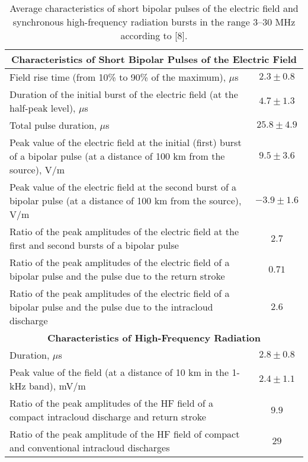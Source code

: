 \documentclass[a4paper, 12pt, onecolumn,singlespacing]{article}
\begin{document}
	\begin{table}[htbp]
		\centering
		\caption{Average characteristics of short bipolar pulses of the electric field and synchronous high-frequency radiation bursts in the range 3--30 MHz according to [8].}
		\begin{tabularx}{\textwidth}{@{}p{10cm}c@{}}
			\toprule
			\multicolumn{2}{c}{\textbf{Characteristics of Short Bipolar Pulses of the Electric Field}} \\
			\midrule
			Field rise time (from 10\% to 90\% of the maximum), $\mu$s & $2.3 \pm 0.8$ \\
			Duration of the initial burst of the electric field (at the half-peak level), $\mu$s & $4.7 \pm 1.3$ \\
			\midrule
			Total pulse duration, $\mu$s & $25.8 \pm 4.9$ \\
			\midrule
			Peak value of the electric field at the initial (first) burst of a bipolar pulse (at a distance of 100 km from the source), V/m & $9.5 \pm 3.6$ \\
			\midrule
			Peak value of the electric field at the second burst of a bipolar pulse (at a distance of 100 km from the source), V/m & $-3.9 \pm 1.6$ \\
			\midrule
			Ratio of the peak amplitudes of the electric field at the first and second bursts of a bipolar pulse & $2.7$ \\
			\midrule
			Ratio of the peak amplitudes of the electric field of a bipolar pulse and the pulse due to the return stroke & $0.71$ \\
			\midrule
			Ratio of the peak amplitudes of the electric field of a bipolar pulse and the pulse due to the intracloud discharge & $2.6$ \\
			\midrule
			\multicolumn{2}{c}{\textbf{Characteristics of High-Frequency Radiation}} \\
			\midrule
			Duration, $\mu$s & $2.8 \pm 0.8$ \\
			Peak value of the field (at a distance of 10 km in the 1-kHz band), mV/m & $2.4 \pm 1.1$ \\
			\midrule
			Ratio of the peak amplitudes of the HF field of a compact intracloud discharge and return stroke & $9.9$ \\
			\midrule
			Ratio of the peak amplitude of the HF field of compact and conventional intracloud discharges & $29$ \\
			\bottomrule
		\end{tabularx}
	\end{table}
\end{document}
